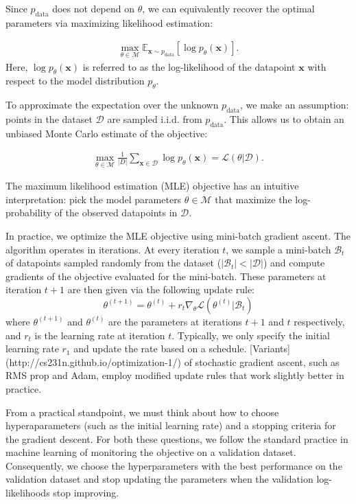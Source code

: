 Since $p_{\mathrm{data}}$ does not depend on $\theta$, we can equivalently recover the optimal parameters via maximizing likelihood estimation:

$$
\begin{align*}
\max_{\theta\in \mathcal{M}}\mathbb{E}_{\mathbf{x} \sim p_{\mathrm{data}} }\left[\log p_{\theta}(\mathbf{x})\right].
\end{align*}
$$
Here, $\log p_{\theta}(\mathbf{x})$ is referred to as the log-likelihood of the datapoint $\mathbf{x}$ with respect to the model distribution $p_\theta$. 

To approximate the expectation over the unknown $p_{\mathrm{data}}$, we make an assumption: points in the dataset $\mathcal{D}$ are sampled i.i.d. from $p_{\mathrm{data}}$. This allows us to obtain an unbiased Monte Carlo estimate of the objective:

$$
\begin{align}
\max_{\theta\in \mathcal{M}}\frac{1}{\vert D \vert} \sum_{\mathbf{x} \in\mathcal{D} }\log p_{\theta}(\mathbf{x}) = \mathcal{L}(\theta \vert \mathcal{D}).
\end{align}
\label{eq:mle}
\tag{2}
$$

The maximum likelihood estimation (MLE) objective has an intuitive interpretation: pick the model parameters $\theta \in \mathcal{M}$ that maximize the log-probability of the observed datapoints in $\mathcal{D}$. 

In practice, we optimize the MLE objective using mini-batch gradient ascent. The algorithm operates in iterations. At every iteration $t$, we sample a mini-batch $\mathcal{B}_t$  of datapoints sampled randomly from the dataset ($\vert \mathcal{B}_t\vert < \vert \mathcal{D} \vert$) and compute gradients of the objective evaluated for the mini-batch. These parameters at iteration $t+1$ are then given via the following update rule:
\[
\theta^{(t+1)} = \theta^{(t)} + r_t \nabla_\theta\mathcal{L}(\theta^{(t)} \vert \mathcal{B}_t)
\]
where $\theta^{(t+1)}$ and $\theta^{(t)}$ are the parameters at iterations $t+1$ and $t$ respectively, and $r_t$ is the learning rate at iteration $t$.  Typically, we only specify the initial learning rate $r_1$ and update the rate based on a schedule.  [Variants](http://cs231n.github.io/optimization-1/) of stochastic gradient ascent, such as RMS prop and Adam, employ modified update rules that work slightly better in practice. 

From a practical standpoint, we must think about how to choose hyperaparameters (such as the initial learning rate) and a stopping criteria for the gradient descent. For both these questions, we follow the standard practice in machine learning of monitoring the objective on a validation dataset. Consequently, we choose the hyperparameters with the best performance on the validation dataset and stop updating the parameters when the validation log-likelihoods stop improving.

